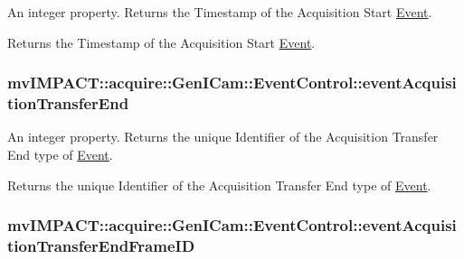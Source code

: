 An integer property. Returns the Timestamp of the Acquisition Start \hyperlink{classmv_i_m_p_a_c_t_1_1acquire_1_1_event}{Event}. 

Returns the Timestamp of the Acquisition Start \hyperlink{classmv_i_m_p_a_c_t_1_1acquire_1_1_event}{Event}. \hypertarget{classmv_i_m_p_a_c_t_1_1acquire_1_1_gen_i_cam_1_1_event_control_a5c9bcb0aaafaf777fea50314c8a00028}{
\subsubsection[{event\+Acquisition\+Transfer\+End}]{ mv\+I\+M\+P\+A\+C\+T\+::acquire\+::\+Gen\+I\+Cam\+::\+Event\+Control\+::event\+Acquisition\+Transfer\+End}}\label{classmv_i_m_p_a_c_t_1_1acquire_1_1_gen_i_cam_1_1_event_control_a5c9bcb0aaafaf777fea50314c8a00028}


An integer property. Returns the unique Identifier of the Acquisition Transfer End type of \hyperlink{classmv_i_m_p_a_c_t_1_1acquire_1_1_event}{Event}. 

Returns the unique Identifier of the Acquisition Transfer End type of \hyperlink{classmv_i_m_p_a_c_t_1_1acquire_1_1_event}{Event}. \hypertarget{classmv_i_m_p_a_c_t_1_1acquire_1_1_gen_i_cam_1_1_event_control_af3d8677549c711684e9787f684d20070}{
\subsubsection[{event\+Acquisition\+Transfer\+End\+Frame\+I\+D}]{ mv\+I\+M\+P\+A\+C\+T\+::acquire\+::\+Gen\+I\+Cam\+::\+Event\+Control\+::event\+Acquisition\+Transfer\+End\+Frame\+I\+D}}\label{classmv_i_m_p_a_c_t_1_1acquire_1_1_gen_i_cam_1_1_event_control_af3d8677549c711684e9787f684d20070}


